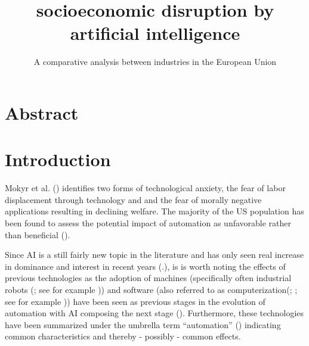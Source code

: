 \documentclass[
  11,
  a4paperpaper,
]{article}
\title{socioeconomic disruption by artificial intelligence}
\subtitle{A comparative analysis between industries in the European
Union}
\author{}
\date{}
\let\oldsection\section
\renewcommand\section{\clearpage\oldsection}
\begin{document}
\maketitle
{}

\newpage{}

\tableofcontents

\newpage{}

\listoffigures

\newpage{}

\listoftables

\newpage{}


\section{Abstract}\label{abstract}

\section{Introduction}\label{introduction}

Mokyr et al. () identifies
two forms of technological anxiety, the fear of labor displacement
through technology and and the fear of morally negative applications
resulting in declining welfare. The majority of the US population has
been found to assess the potential impact of automation as unfavorable
rather than beneficial
().

Since AI is a still fairly new topic in the literature and has only seen
real increase in dominance and interest in recent years
(.), is
is worth noting the effects of previous technologies as the adoption of
machines (specifically often industrial robots
(; see
for example
)) and
software (also referred to as
computerization(;
; see for example
))
have been seen as previous stages in the evolution of automation with AI
composing the next stage (). Furthermore, these technologies have been summarized
under the umbrella term ``automation''
()
indicating common characteristics and thereby - possibly - common
effects.
\end{document}
